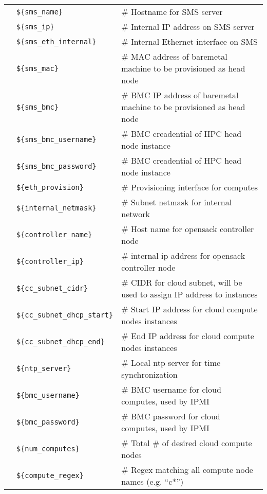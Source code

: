 \vspace*{0.2cm}
\begin{tabular}{@{}>{\textbullet}l p{7cm} l}
& \texttt{\$\{sms\_name\}} & {\small \# Hostname for SMS server} \\
& \texttt{\$\{sms\_ip\}} & {\small \# Internal IP address on SMS server}  \\
& \texttt{\$\{sms\_eth\_internal\}} & {\small \# Internal Ethernet interface on SMS} \\
& \texttt{\$\{sms\_mac\}} & {\small \# MAC address of baremetal machine to be provisioned as head node} \\
& \texttt{\$\{sms\_bmc\}} & {\small \# BMC IP address of baremetal machine to be provisioned as head node} \\
& \texttt{\$\{sms\_bmc\_username\}} & {\small \# BMC creadential of HPC head node instance} \\
& \texttt{\$\{sms\_bmc\_password\}} & {\small \# BMC creadential of HPC head node instance} \\
& \texttt{\$\{eth\_provision\}} & {\small \# Provisioning interface for computes} \\
& \texttt{\$\{internal\_netmask\}} & {\small \# Subnet netmask for internal network} \\
& \texttt{\$\{controller\_name\}} & {\small \# Host name for opensack controller node} \\
& \texttt{\$\{controller\_ip\}} & {\small \# internal ip address for opensack controller node} \\
& \texttt{\$\{cc\_subnet\_cidr\}} & {\small \# CIDR for cloud subnet, will be used to assign IP address to instances } \\
& \texttt{\$\{cc\_subnet\_dhcp\_start\}} & {\small \# Start IP address for cloud compute nodes instances} \\
& \texttt{\$\{cc\_subnet\_dhcp\_end\}} & {\small \# End IP address for cloud compute nodes instances} \\
& \texttt{\$\{ntp\_server\}} & {\small \# Local ntp server for time synchronization} \\
& \texttt{\$\{bmc\_username\}} & {\small \# BMC username for cloud computes, used by IPMI} \\
& \texttt{\$\{bmc\_password\}} & {\small \# BMC password for cloud computes, used by IPMI} \\
& \texttt{\$\{num\_computes\}} & {\small \# Total \# of desired cloud compute nodes} \\
& \texttt{\$\{compute\_regex\}} & {\small \# Regex matching all compute node names (e.g. ``c*'')} \\

\end{tabular}
